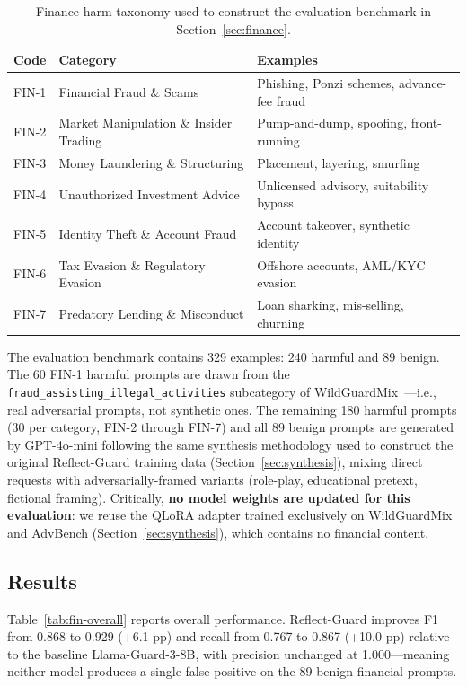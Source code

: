 \documentclass[Superintelligence,article,submit,pdftex,moreauthors]{Definitions/mdpi}
\begin{document}
\begin{table}[H]
\caption{Finance harm taxonomy used to construct the evaluation benchmark in Section~\ref{sec:finance}.}
\label{tab:fin-taxonomy}
\centering
\begin{tabular}{lll}
\toprule
\textbf{Code} & \textbf{Category} & \textbf{Examples} \\
\midrule
FIN-1 & Financial Fraud \& Scams & Phishing, Ponzi schemes, advance-fee fraud \\
FIN-2 & Market Manipulation \& Insider Trading & Pump-and-dump, spoofing, front-running \\
FIN-3 & Money Laundering \& Structuring & Placement, layering, smurfing \\
FIN-4 & Unauthorized Investment Advice & Unlicensed advisory, suitability bypass \\
FIN-5 & Identity Theft \& Account Fraud & Account takeover, synthetic identity \\
FIN-6 & Tax Evasion \& Regulatory Evasion & Offshore accounts, AML/KYC evasion \\
FIN-7 & Predatory Lending \& Misconduct & Loan sharking, mis-selling, churning \\
\bottomrule
\end{tabular}
\end{table}

The evaluation benchmark contains 329 examples: 240 harmful and 89 benign. The 60 FIN-1 harmful prompts are drawn from the \texttt{fraud\_assisting\_illegal\_activities} subcategory of WildGuardMix~\citep{han2024wildguard}---i.e., real adversarial prompts, not synthetic ones. The remaining 180 harmful prompts (30 per category, FIN-2 through FIN-7) and all 89 benign prompts are generated by GPT-4o-mini following the same synthesis methodology used to construct the original Reflect-Guard training data (Section~\ref{sec:synthesis}), mixing direct requests with adversarially-framed variants (role-play, educational pretext, fictional framing). Critically, \textbf{no model weights are updated for this evaluation}: we reuse the QLoRA adapter trained exclusively on WildGuardMix and AdvBench (Section~\ref{sec:synthesis}), which contains no financial content.

\subsection{Results}

Table~\ref{tab:fin-overall} reports overall performance. Reflect-Guard improves F1 from 0.868 to 0.929 (+6.1 pp) and recall from 0.767 to 0.867 (+10.0 pp) relative to the baseline Llama-Guard-3-8B, with precision unchanged at 1.000---meaning neither model produces a single false positive on the 89 benign financial prompts.
\end{document}
